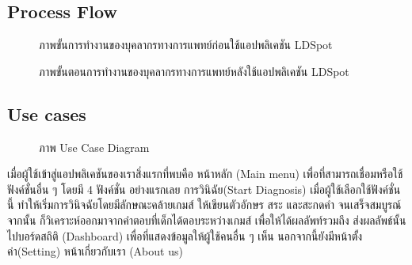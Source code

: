 \documentclass[12pt,oneside,openright,a4paper]{cpe-thai-project}
\begin{document}
\subsection{Process Flow}
\begin{figure}[!ht]\centering
  \setlength{\fboxrule}{0.2mm} %
  \setlength{\fboxsep}{1cm}
  \caption{ภาพขั้นการทำงานของบุคลากรทางการแพทย์ก่อนใช้แอปพลิเคชัน LDSpot}\label{fig:usecase}
\end{figure}
\begin{figure}[!ht]\centering
  \setlength{\fboxrule}{0.2mm} %
  \setlength{\fboxsep}{1cm}
  \caption{ภาพขั้นตอนการทำงานของบุคลากรทางการแพทย์หลังใช้แอปพลิเคชัน LDSpot}\label{fig:usecase}
\end{figure}
\newpage
\subsection{Use cases}
\begin{figure}[!ht]\centering
  \setlength{\fboxrule}{0.2mm} %
  \setlength{\fboxsep}{1cm}
  \caption{ภาพ Use Case Diagram}\label{fig:usecase}
\end{figure}
เมื่อผู้ใช้เข้าสู่แอปพลิเคชันของเราสิ่งแรกที่พบคือ หน้าหลัก (Main menu) เพื่อที่สามารถเชื่อมหรือใช้ฟังค์ชั่นอื่น ๆ โดยมี 4 ฟังค์ชั่น อย่างแรกเลย 
การวินิฉัย(Start Diagnosis) เมื่อผู้ใช้เลือกใช้ฟังค์ชั่นนี้ ทำให้เริ่มการวินิจฉัยโดยมีลักษณะคล้ายเกมส์ ให้เขียนตัวอักษร สระ และสะกดคำ จนเสร็จสมบูรณ์จากนั้น ก็วิเคราะห์ออกมาจากคำตอบที่เด็กได้ตอบระหว่างเกมส์ 
เพื่อให้ได้ผลลัพท์รวมถึง ส่งผลลัพธ์นั้นไปบอร์ดสถิติ (Dashboard) เพื่อที่แสดงข้อมูลให้ผู้ใช้คนอื่น ๆ เห็น นอกจากนี้ยังมีหน้าตั้งค่า(Setting) หน้าเกี่ยวกับเรา (About us) 
\end{document}
